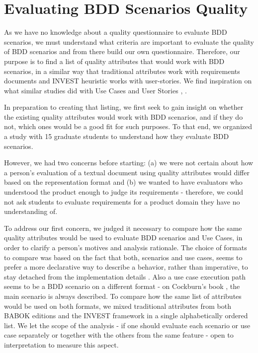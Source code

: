 \section{Evaluating BDD Scenarios Quality}

As we have no knowledge about a quality questionnaire to evaluate BDD scenarios, we must understand what criteria are important to evaluate the quality of BDD scenarios and from there build our own questionnaire. Therefore, our purpose is to find a list of quality attributes that would work with BDD scenarios, in a similar way that traditional attributes \cite{Babok_2009} \cite{Babok_2015} work with requirements documents and INVEST heuristic \cite{Cohn_2004} works with user-stories. We find inspiration on what similar studies did with Use Cases \cite{Cockburn_2000} \cite{Karl_et_dot_all_2014} \cite{Tiwari_and_Gupta_2015} and User Stories \cite{Heck_2014}, \cite{Lucassen_et_dot_al_2015}. 

In preparation to creating that listing, we first seek to gain insight on whether the existing quality attributes would work with BDD scenarios, and if they do not, which ones would be a good fit for such purposes. To that end, we organized a study with 15 graduate students to understand how they evaluate BDD scenarios. 

However, we had two concerns before starting: (a) we were not certain about how a person's evaluation of a textual document using quality attributes would differ based on the representation format and (b) we wanted to have evaluators who understood the product enough to judge its requirements - therefore, we could not ask students to evaluate requirements for a product domain they have no understanding of.

To address our first concern, we judged it necessary to compare how the same quality attributes would be used to evaluate BDD scenarios and Use Cases, in order to clarify a person's motives and analysis rationale. The choice of formats to compare was based on the fact that both, scenarios and use cases, seems to prefer a more declarative way to describe a behavior, rather than imperative, to stay detached from the implementation details \cite{Cockburn_2000} \cite{Smart_2014}. Also a use case execution path seems to be a BDD scenario on a different format - on Cockburn's book \cite{Cockburn_2000}, the main scenario is always described. To compare how the same list of attributes would be used on both formats, we mixed traditional attributes from both BABOK editions \cite{Babok_2009} \cite{Babok_2015} and the INVEST framework \cite{Cohn_2004} in a single alphabetically ordered list. We let the scope of the analysis - if one should evaluate each scenario or use case separately or together with the others from the same feature - open to interpretation to measure this aspect. 

